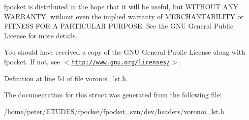 fpocket is distributed in the hope that it will be useful, but WITHOUT ANY WARRANTY; without even the implied warranty of MERCHANTABILITY or FITNESS FOR A PARTICULAR PURPOSE. See the GNU General Public License for more details.

You should have received a copy of the GNU General Public License along with fpocket. If not, see $<$\href{http://www.gnu.org/licenses/}{\tt http://www.gnu.org/licenses/}$>$. 

Definition at line 54 of file voronoi\_\-lst.h.

The documentation for this struct was generated from the following file:\begin{CompactItemize}
\item 
/home/peter/ETUDES/fpocket/fpocket\_\-svn/dev/headers/voronoi\_\-lst.h\end{CompactItemize}
